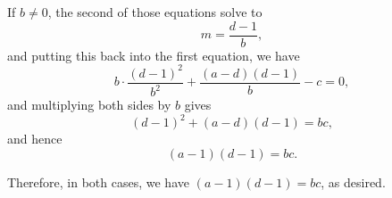 \begin{enumerate}
          If \(b \neq 0\), the second of those equations solve to
          \[
              m = \frac{d - 1}{b},
          \]
          and putting this back into the first equation, we have
          \[
              b \cdot \frac{(d - 1)^2}{b^2} + \frac{(a - d)(d - 1)}{b} - c = 0,
          \]
          and multiplying both sides by \(b\) gives
          \[
              (d - 1)^2 + (a - d)(d - 1) = bc,
          \]
          and hence
          \[
              (a - 1)(d - 1) = bc.
          \]

          Therefore, in both cases, we have \((a - 1)(d - 1) = bc\), as desired.
\end{enumerate}